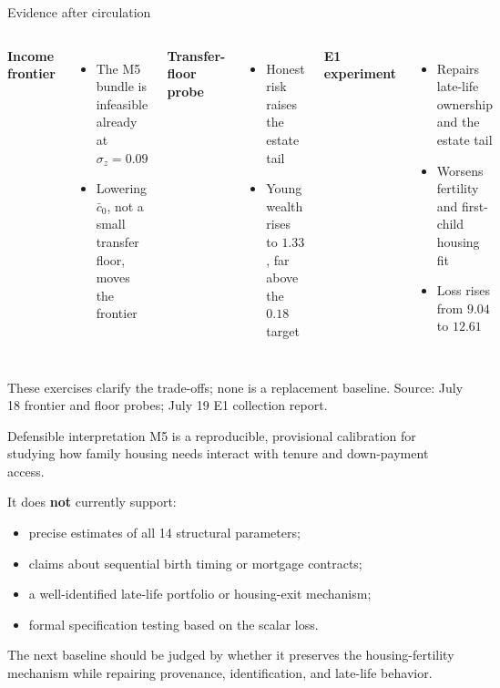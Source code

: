 \documentclass[aspectratio=169,11pt]{beamer}
\newcommand{\source}[1]{\vfill{\color{Muted}\tiny Source: #1}}
\newcommand{\tightitems}{\setlength{\itemsep}{0.55em}}
\begin{document}
\begin{frame}{Evidence after circulation}
  \begin{columns}[T,onlytextwidth]
      \textbf{Income frontier}
      \begin{itemize}\tightitems
        \item The M5 bundle is infeasible already at $\sigma_z=0.09$
        \item Lowering $\bar c_0$, not a small transfer floor, moves the frontier
      \end{itemize}
      \textbf{Transfer-floor probe}
      \begin{itemize}\tightitems
        \item Honest risk raises the estate tail
        \item Young wealth rises to $1.33$, far above the $0.18$ target
      \end{itemize}
      \textbf{E1 experiment}
      \begin{itemize}\tightitems
        \item Repairs late-life ownership and the estate tail
        \item Worsens fertility and first-child housing fit
        \item Loss rises from $9.04$ to $12.61$
      \end{itemize}
  \end{columns}

  \vspace{0.8em}
  These exercises clarify the trade-offs; none is a replacement baseline.
  \source{July 18 frontier and floor probes; July 19 E1 collection report.}
\end{frame}

\begin{frame}{Defensible interpretation}
  \large
  M5 is a reproducible, provisional calibration for studying how family housing needs interact with tenure and down-payment access.

  \vspace{0.9em}
  It does \textbf{not} currently support:
  \begin{itemize}\tightitems
    \item precise estimates of all 14 structural parameters;
    \item claims about sequential birth timing or mortgage contracts;
    \item a well-identified late-life portfolio or housing-exit mechanism;
    \item formal specification testing based on the scalar loss.
  \end{itemize}

  \vspace{0.5em}
  The next baseline should be judged by whether it preserves the housing-fertility mechanism while repairing provenance, identification, and late-life behavior.
\end{frame}
\end{document}
